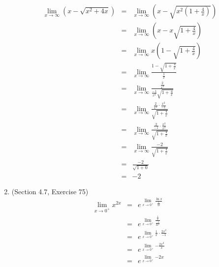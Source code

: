 \documentclass{article}
\begin{document}
\begin{enumerate}
        \begin{eqnarray}
            \lim_{x \to \infty}{\left(x - \sqrt{x^2 + 4x}\right)} &=& \lim_{x \to \infty}{\left(x - \sqrt{x^2\left(1 + \frac{4}{x}\right)}\right)} \\
                                                                  &=& \lim_{x \to \infty}{\left(x - x\sqrt{1 + \frac{4}{x}}\right)} \\
                                                                  &=& \lim_{x \to \infty}{x\left(1 - \sqrt{1 + \frac{4}{x}}\right)} \\
                                                                  &=& \lim_{x \to \infty}{\frac{1 - \sqrt{1 + \frac{4}{x}}}{\frac{1}{x}}} \\
                                                                  &=& \lim_{x \to \infty}{\frac{\frac{2}{x^2}}{\frac{-1}{x^2}\sqrt{1 + \frac{4}{x}}}} \\
                                                                  &=& \lim_{x \to \infty}{\frac{\frac{2}{x^2}\cdot\frac{x^2}{-1}}{\sqrt{1 + \frac{4}{x}}}} \\
                                                                  &=& \lim_{x \to \infty}{\frac{\frac{2}{-1}\cdot\frac{x^2}{x^2}}{\sqrt{1 + \frac{4}{x}}}} \\
                                                                  &=& \lim_{x \to \infty}{\frac{-2}{\sqrt{1 + \frac{4}{x}}}} \\
                                                                  &=& \frac{-2}{\sqrt{1 + 0}} \\
                                                                  &=& -2
        \end{eqnarray}
    \item (Section 4.7, Exercise 75)
        \begin{eqnarray}
            \lim_{x \to 0^+}{x^{2x}} &=& e^{\lim\limits_{x \to 0^+}{\frac{\ln{x}}{\frac{1}{2x}}}} \\
                                     &=& e^{\lim\limits_{x \to 0^+}{\frac{\frac{1}{x}}{\frac{-1}{2x^2}}}} \\
                                     &=& e^{\lim\limits_{x \to 0^+}{\frac{1}{x}\cdot\frac{2x^2}{-1}}} \\
                                     &=& e^{\lim\limits_{x \to 0^+}{-\frac{2x^2}{x}}} \\
                                     &=& e^{\lim\limits_{x \to 0^+}{-2x}} \\

\end{eqnarray}
\end{enumerate}
\end{document}
